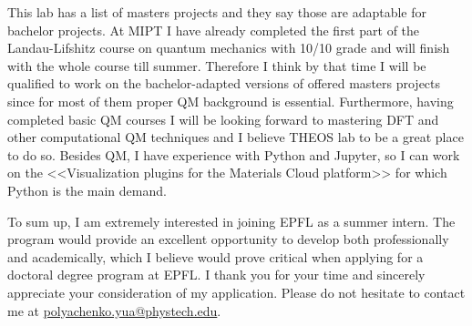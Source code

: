\documentclass[12pt, a4paper]{awesome-cv}
\begin{document}
\begin{cvletter}
This lab has a list of masters projects and they say those are adaptable for bachelor projects. At MIPT I have already completed the first part of the Landau-Lifshitz course on quantum mechanics with 10/10 grade and will finish with the whole course till summer. Therefore I think by that time I will be qualified to work on the bachelor-adapted versions of offered masters projects since for most of them proper QM background is essential. Furthermore, having completed basic QM courses I will be looking forward to mastering DFT and other computational QM techniques and I believe THEOS lab to be a great place to do so. Besides QM, I have experience with Python and Jupyter, so I can work on the <<Visualization plugins for the Materials Cloud platform>> for which Python is the main demand.


\end{cvletter}



To sum up, I am extremely interested in joining EPFL as a summer intern. The program would provide an excellent opportunity to develop both professionally and academically, which I believe would prove critical when applying for a doctoral degree program at EPFL. I thank you for your time and sincerely appreciate your consideration of my application. Please do not hesitate to contact me at \href{mailto:polyachenko.yua@phystech.edu}{polyachenko.yua@phystech.edu}.


\makeletterclosing
\end{document}
